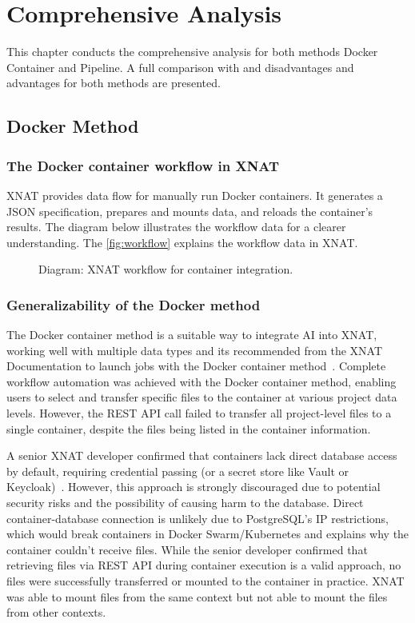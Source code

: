 \chapter{Comprehensive Analysis}
This chapter conducts the comprehensive analysis for both methods Docker Container and Pipeline. 
A full comparison with and disadvantages and advantages for both methods are presented.
\section{Docker Method}
\subsection{The Docker container workflow in XNAT}

XNAT provides data flow for manually run Docker containers. It generates a JSON specification, prepares and mounts data, and reloads the container's results.
The diagram below illustrates the workflow data for a clearer understanding.  
The \autoref{fig:workflow} explains the workflow data in XNAT.

\begin{figure}[H]
    \centering
    \def\svgwidth{\linewidth} 
    
    \caption{Diagram: XNAT workflow for container integration.}
    \label{fig:workflow}
\end{figure}

\subsection{Generalizability of the Docker method}
The Docker container method is a suitable way to integrate AI into XNAT, working well with multiple data types and its recommended from the XNAT Documentation to launch jobs with the Docker container method~\cite{pipepreference}. Complete workflow automation was achieved with the Docker container method, enabling users to select and transfer specific files to the container at various project data levels. However, the REST API call failed to transfer all project-level files to a single container, despite the files being listed in the container information.  

A senior XNAT developer confirmed that containers lack direct database access by default, requiring credential passing (or a secret store like Vault or Keycloak)~\cite{database}. However, this approach is strongly discouraged due to potential security risks and the possibility of causing harm to the database. Direct container-database connection is unlikely due to PostgreSQL's IP restrictions, which would break containers in Docker Swarm/Kubernetes and explains why the container couldn't receive files.
While the senior developer confirmed that retrieving files via REST API during container execution is a valid approach, no files were successfully transferred or mounted to the container in practice. 
XNAT was able to mount files from the same context but not able to mount the files from other contexts.


